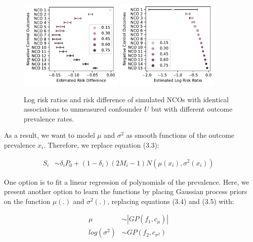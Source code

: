 \begin{figure}[H]
    \centering
    \includegraphics[width=0.45\textwidth]{figures/demo-rd.pdf}
    \includegraphics[width=0.45\textwidth]{figures/demo-lrr.pdf}
    \caption[Log risk ratios and risk difference of simulated NCOs with different outcome prevalence rates.]{Log risk ratios and risk difference of simulated NCOs with identical associations to unmeasured confounder $U$ but with different outcome prevalence rates.}
    \label{fig:nco-demo}
\end{figure}

As a result, we want to model $\mu$ and $\sigma^2$ as smooth functions of the outcome prevalence $x_i$. Therefore, we replace equation (3.3):

\begin{align}
    S_{i} &\sim \delta_i P_0 + (1-\delta_i) (2M_i - 1) N(\mu(x_i), \sigma^2(x_i))
\end{align}

One option is to fit a linear regression of polynomials of the prevalence. Here, we present another option to learn the functions by placing Gaussian process priors on the function $\mu(.)$ and $\sigma^2(.)$, replacing equations (3.4) and (3.5) with:

\begin{align}
    \mu &\sim |GP(f_1, c_\mu)| \\
    log(\sigma^2) &\sim GP(f_2, c_{\sigma^2})
\end{align}

